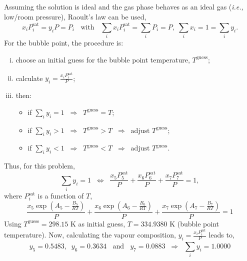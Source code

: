 \documentclass[12pts,a4paper,amsmath,amssymb,floatfix]{article}%
\newcommand{\frc}{\displaystyle\frac}
\newcommand{\ie}{{\it i.e., }}
\newcommand{\summation}[3][error]{\sum\limits_{#2}^{#3}#1}
\begin{document}
\begin{enumerate}[1)]
  Assuming the solution is ideal and the gas phase behaves as an ideal gas (\ie low/room pressure), Raoult's law can be used,
    \begin{displaymath}
       x_{i}P_{i}^{\text{sat}} = y_{i}P = P_{i} \;\;\text{ with }\;\; \summation[x_{i}P_{i}^{\text{sat}}]{i}{} = \summation[P_{i}]{i}{} = P, \;\summation[x_{i}]{i}{}=1=\summation[y_{i}]{i}{}.
    \end{displaymath}
    For the bubble point, the procedure is:
    \begin{enumerate}[i)]
       \item choose an initial guess for the bubble point temperature, $T^{\text{guess}}$;
       \item calculate $y_{i}=\frc{x_{i}P_{i}^{\text{sat}}}{P}$;
       \item then:
           \begin{itemize}
              \item if $\summation[y_{i}]{i}{} = 1 \;\;\Rightarrow \;\; T^{\text{guess}} = T$;
              \item if $\summation[y_{i}]{i}{} > 1 \;\;\Rightarrow \;\; T^{\text{guess}} > T \;\; \Rightarrow\;\; \text{adjust } T^{\text{guess}}$;
              \item if $\summation[y_{i}]{i}{} < 1 \;\;\Rightarrow \;\; T^{\text{guess}} < T \;\; \Rightarrow\;\; \text{adjust } T^{\text{guess}}$.
           \end{itemize}
    \end{enumerate}
    Thus, for this problem,
    \begin{displaymath}
        \summation[y_{i}]{i}{} = 1\;\; \Longleftrightarrow \;\; \frc{x_{5}P_{5}^{\text{sat}}}{P} + \frc{x_{6}P_{6}^{\text{sat}}}{P} + \frc{x_{7}P_{7}^{\text{sat}}}{P} = 1,
    \end{displaymath}
    where $P_{i}^{\text{sat}}$ is a function of $T$, 
    \begin{displaymath}
        \frc{x_{5}\exp{\left(A_{5}-\frc{B_{5}}{RT}\right)}}{P} + \frc{x_{6}\exp{\left(A_{6}-\frc{B_{6}}{RT}\right)}}{P} + \frc{x_{7}\exp{\left(A_{7}-\frc{B_{7}}{RT}\right)}}{P} = 1
    \end{displaymath}
    Using $T^{\text{guess}}=298.15$ K as initial guess, $T=334.9380$ K (bubble point temperature). Now, calculating the vapour composition, $y_{i}=\frc{x_{i}P_{i}^{\text{sat}}}{P}$ leads to,
    \begin{displaymath}
        y_{5} =0.5483,\;\; y_{6} = 0.3634\;\;\text{ and }\;\;y_{7} = 0.0883\;\;\Rightarrow\;\; \summation[y_{i}]{i}{} = 1.0000
    \end{displaymath}


\end{enumerate}
\end{document}
